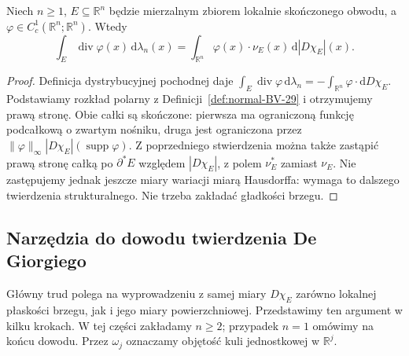 \begin{twierdzenie}
\label{thm:gauss-green-BV-29}
Niech $n\ge1$, $E\subseteq\mathbb R^n$ będzie
mierzalnym zbiorem lokalnie skończonego obwodu,
a $\varphi\in C_c^1(\mathbb R^n;\mathbb R^n)$.
Wtedy
\begin{equation}\label{eq:gauss-green-BV-29}
 \int_E\operatorname{div}\varphi(x)
 \,\mathrm d\lambda_n(x)
 =\int_{\mathbb R^n}\varphi(x)\cdot\nu_E(x)
 \,\mathrm d|D\chi_E|(x).
\end{equation}
\end{twierdzenie}
\begin{proof}
Definicja dystrybucyjnej pochodnej daje
$\int_E\operatorname{div}\varphi\,\mathrm d\lambda_n=-\int_{\mathbb R^n}\varphi\cdot\mathrm dD\chi_E$.
Podstawiamy rozkład polarny z
Definicji~\ref{def:normal-BV-29} i otrzymujemy
prawą stronę. Obie całki są skończone:
pierwsza ma ograniczoną funkcję podcałkową
o zwartym nośniku, druga jest ograniczona przez
$\|\varphi\|_\infty|D\chi_E|(\operatorname{supp}\varphi)$.
Z poprzedniego stwierdzenia można także zastąpić
prawą stronę całką po $\partial^*E$ względem
$|D\chi_E|$, z polem $\nu_E^*$ zamiast $\nu_E$.
Nie zastępujemy jednak jeszcze miary wariacji
miarą Hausdorffa: wymaga to dalszego twierdzenia
strukturalnego. Nie trzeba zakładać gładkości brzegu.
\end{proof}

\subsection*{Narzędzia do dowodu twierdzenia De Giorgiego}
Główny trud polega na wyprowadzeniu z samej miary $D\chi_E$
zarówno lokalnej płaskości brzegu, jak i jego miary powierzchniowej.
Przedstawimy ten argument w kilku krokach. W tej części zakładamy
$n\ge2$; przypadek $n=1$ omówimy na końcu dowodu.
Przez $\omega_j$ oznaczamy objętość kuli jednostkowej
w $\mathbb R^j$.

